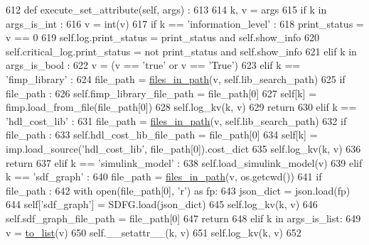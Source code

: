 \begin{DoxyCode}
612   \textcolor{keyword}{def }execute\_set\_attribute(self, args) :
613 
614     k, v = args
615     \textcolor{keywordflow}{if} k \textcolor{keywordflow}{in} args\_is\_int :
616       v = int(v)
617       \textcolor{keywordflow}{if} k == \textcolor{stringliteral}{'information\_level'} :
618         print\_status = v == 0
619         self.log.print\_status = print\_status \textcolor{keywordflow}{and} self.show\_info
620         self.critical\_log.print\_status = \textcolor{keywordflow}{not} print\_status \textcolor{keywordflow}{and} self.show\_info
621     \textcolor{keywordflow}{elif} k \textcolor{keywordflow}{in} args\_is\_bool :
622       v = (v == \textcolor{stringliteral}{'true'} \textcolor{keywordflow}{or} v == \textcolor{stringliteral}{'True'})
623     \textcolor{keywordflow}{elif} k == \textcolor{stringliteral}{'fimp\_library'} :
624       file\_path = \hyperlink{namespacesylva_1_1misc_1_1util_a7ad460a52be16d3083cb41f0be004714}{files\_in\_path}(v, self.lib\_search\_path)
625       \textcolor{keywordflow}{if} file\_path :
626         self.fimp\_library\_file\_path = file\_path[0]
627         self[k] = fimp.load\_from\_file(file\_path[0])
628         self.log\_kv(k, v)
629         \textcolor{keywordflow}{return}
630     \textcolor{keywordflow}{elif} k == \textcolor{stringliteral}{'hdl\_cost\_lib'} :
631       file\_path = \hyperlink{namespacesylva_1_1misc_1_1util_a7ad460a52be16d3083cb41f0be004714}{files\_in\_path}(v, self.lib\_search\_path)
632       \textcolor{keywordflow}{if} file\_path :
633         self.hdl\_cost\_lib\_file\_path = file\_path[0]
634         self[k] = imp.load\_source(\textcolor{stringliteral}{'hdl\_cost\_lib'}, file\_path[0]).cost\_dict
635         self.log\_kv(k, v)
636         \textcolor{keywordflow}{return}
637     \textcolor{keywordflow}{elif} k == \textcolor{stringliteral}{'simulink\_model'} :
638       self.load\_simulink\_model(v)
639     \textcolor{keywordflow}{elif} k == \textcolor{stringliteral}{'sdf\_graph'} :
640       file\_path = \hyperlink{namespacesylva_1_1misc_1_1util_a7ad460a52be16d3083cb41f0be004714}{files\_in\_path}(v, os.getcwd())
641       \textcolor{keywordflow}{if} file\_path :
642         with open(file\_path[0], \textcolor{stringliteral}{'r') as fp:}
643 \textcolor{stringliteral}{          json\_dict = json.load(fp)}
644 \textcolor{stringliteral}{        self['sdf\_graph'}] = SDFG.load(json\_dict)
645         self.log\_kv(k, v)
646         self.sdf\_graph\_file\_path = file\_path[0]
647         \textcolor{keywordflow}{return}
648     \textcolor{keywordflow}{elif} k \textcolor{keywordflow}{in} args\_is\_list:
649       v = \hyperlink{namespacesylva_1_1misc_1_1util_a03f5cfd365a10a5ec0567e320f987a9b}{to\_list}(v)
650     self.\_\_setattr\_\_(k, v)
651     self.log\_kv(k, v)
652 
\end{DoxyCode}
\mbox{\label{classsylva_1_1misc_1_1exec_1_1_s_y_l_v_a_a6d66a8d4118cd44882b10e31a6486d83}} 
